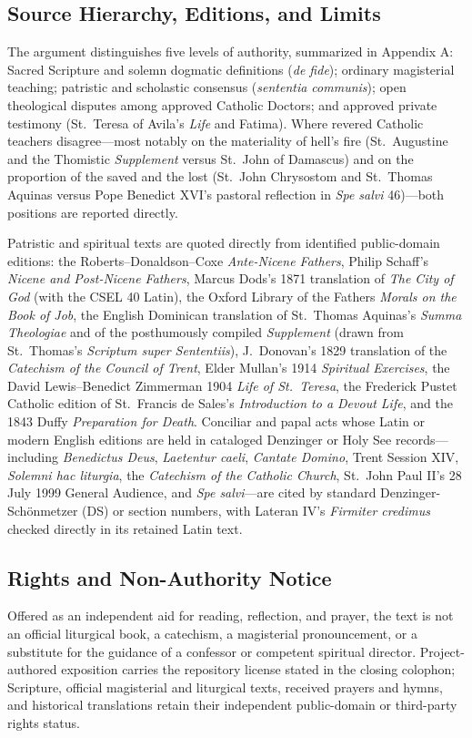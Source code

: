 \subsection*{Source Hierarchy, Editions, and Limits}

The argument distinguishes five levels of authority, summarized in Appendix A: Sacred Scripture and solemn dogmatic definitions (\textit{de fide}); ordinary magisterial teaching; patristic and scholastic consensus (\textit{sententia communis}); open theological disputes among approved Catholic Doctors; and approved private testimony (St.\ Teresa of Avila's \textit{Life} and Fatima). Where revered Catholic teachers disagree---most notably on the materiality of hell's fire (St.\ Augustine and the Thomistic \textit{Supplement} versus St.\ John of Damascus) and on the proportion of the saved and the lost (St.\ John Chrysostom and St.\ Thomas Aquinas versus Pope Benedict XVI's pastoral reflection in \textit{Spe salvi} 46)---both positions are reported directly.

Patristic and spiritual texts are quoted directly from identified public-domain editions: the Roberts--Donaldson--Coxe \textit{Ante-Nicene Fathers}, Philip Schaff's \textit{Nicene and Post-Nicene Fathers}, Marcus Dods's 1871 translation of \textit{The City of God} (with the CSEL 40 Latin), the Oxford Library of the Fathers \textit{Morals on the Book of Job}, the English Dominican translation of St.\ Thomas Aquinas's \textit{Summa Theologiae} and of the posthumously compiled \textit{Supplement} (drawn from St.\ Thomas's \textit{Scriptum super Sententiis}), J.\ Donovan's 1829 translation of the \textit{Catechism of the Council of Trent}, Elder Mullan's 1914 \textit{Spiritual Exercises}, the David Lewis--Benedict Zimmerman 1904 \textit{Life of St.\ Teresa}, the Frederick Pustet Catholic edition of St.\ Francis de Sales's \textit{Introduction to a Devout Life}, and the 1843 Duffy \textit{Preparation for Death}. Conciliar and papal acts whose Latin or modern English editions are held in cataloged Denzinger or Holy See records---including \textit{Benedictus Deus}, \textit{Laetentur caeli}, \textit{Cantate Domino}, Trent Session XIV, \textit{Solemni hac liturgia}, the \textit{Catechism of the Catholic Church}, St.\ John Paul II's 28 July 1999 General Audience, and \textit{Spe salvi}---are cited by standard Denzinger-Sch\"{o}nmetzer (DS) or section numbers, with Lateran IV's \textit{Firmiter credimus} checked directly in its retained Latin text.

\subsection*{Rights and Non-Authority Notice}

Offered as an independent aid for reading, reflection, and prayer, the text is not an official liturgical book, a catechism, a magisterial pronouncement, or a substitute for the guidance of a confessor or competent spiritual director. Project-authored exposition carries the repository license stated in the closing colophon; Scripture, official magisterial and liturgical texts, received prayers and hymns, and historical translations retain their independent public-domain or third-party rights status.
